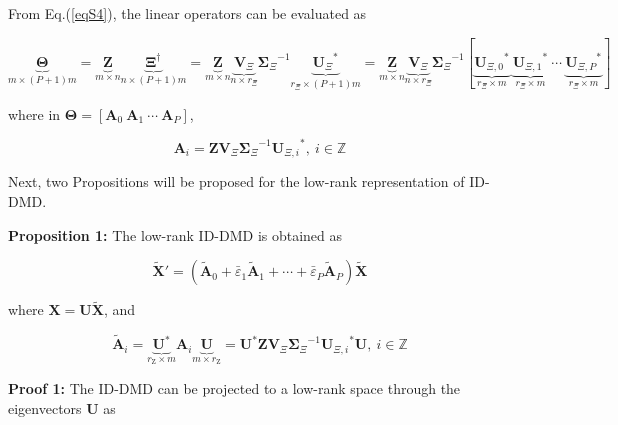 From Eq.(\ref{eqS4}), the linear operators can be evaluated as


\begin{equation}
    \underbrace{\mathbf{\Theta}}_{m\times (P+1)m}=\underbrace{\mathbf{Z}}_{m\times n}\underbrace{\mathbf{\Xi}^{\dagger}}_{n\times (P+1)m}=\underbrace{\mathbf{Z}}_{m\times n}\underbrace{\mathbf{V}_{\Xi}}_{n\times {{r}_{\Xi}}}{\mathbf{\Sigma }_{\Xi}}^{-1}\underbrace{{\mathbf{U}_{\Xi}}^{\text{*}}}_{{{r}_{\Xi}}\times (P+1)m}=\underbrace{\mathbf{Z}}_{m\times n}\underbrace{\mathbf{V}_{\Xi}}_{n\times {{r}_{\Xi}}}{{\mathbf{\Sigma }}_{\Xi}}^{-1}[\underbrace{{\mathbf{U}_{\Xi,0}}^\text{*}}_{{{r}_{\Xi}}\times m}\ \underbrace{{\mathbf{U}_{\Xi,1}}^\text{*}}_{{{r}_{\Xi}}\times m}\ \cdots \ \underbrace{{\mathbf{U}_{\Xi,P}}^\text{*}}_{{{r}_{\Xi}}\times m}] \label{eqS7}
\end{equation}

\noindent where in $\mathbf{\Theta}=[\mathbf{A}_{0}\ \mathbf{A}_{1}\ \cdots \ \mathbf{A}_{P}]$,

\begin{equation*}
    \mathbf{A}_{i}=\mathbf{Z}{\mathbf{V}_{\Xi}}{{\mathbf{\Sigma }}_{\Xi}}^{-1}{\mathbf{U}_{\Xi,i}}^\text{*},\ i\in \mathbb{Z}
\end{equation*}

Next, two Propositions will be proposed for the low-rank representation of ID-DMD. 

\textbf{Proposition 1:} The low-rank ID-DMD is obtained as

\begin{equation}
    \mathbf{\tilde{X}'}=({\mathbf{\tilde{A}}_{0}}+{\bar{\varepsilon}_{1}}{\mathbf{\tilde{A}}}_{1}+\cdots+{\bar{\varepsilon}_{P}}{\mathbf{\tilde{A}}_{P}})\mathbf{\tilde{X}} \label{eqS8}
\end{equation}

\noindent where $\mathbf{X}=\mathbf{U\tilde{X}}$, and

\begin{equation*}    
    \mathbf{\tilde{A}}_{i} =\underbrace{\mathbf{U}^\text{*}}_{{{r}_{\text{Z}}}\times m}{\mathbf{A}_{i}}\underbrace{\mathbf{U}}_{m\times {{r}_{\text{Z}}}}={\mathbf{U}^\text{*}}\mathbf{Z}{\mathbf{V}_{\Xi}}{\mathbf{\Sigma }_{\Xi}}^{-1}{\mathbf{U}_{\Xi,i}}^\text{*}\mathbf{U},\ i\in \mathbb{Z}
\end{equation*}

\textbf{Proof 1:} The ID-DMD can be projected to a low-rank space through the eigenvectors $\mathbf{U}$ as

